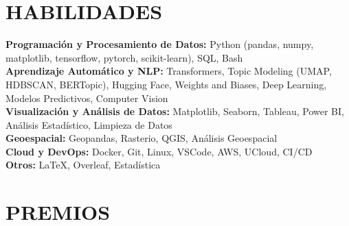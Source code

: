 \documentclass{resume}
\begin{document}
\section{HABILIDADES} 
\begin{content}
    {\bf Programación y Procesamiento de Datos:} Python {\footnotesize (pandas, numpy, matplotlib, tensorflow, pytorch, scikit-learn)}, SQL, Bash \\ 
    {\bf Aprendizaje Automático y NLP:} Transformers, Topic Modeling {\footnotesize (UMAP, HDBSCAN, BERTopic)}, Hugging Face, Weights and Biases, Deep Learning, Modelos Predictivos, Computer Vision \\ 
    {\bf Visualización y Análisis de Datos:} Matplotlib, Seaborn, Tableau, Power BI, Análisis Estadístico, Limpieza de Datos \\ 
    {\bf Geoespacial:} Geopandas, Rasterio, QGIS, Análisis Geoespacial \\ 
    {\bf Cloud y DevOps:} Docker, Git, Linux, VSCode, AWS, UCloud, CI/CD \\
    {\bf Otros:} \LaTeX, Overleaf, Estadística \\
\end{content}

\section{PREMIOS}
\begin{content}
     \\ 
     \\ 
\end{content}
\end{document}
